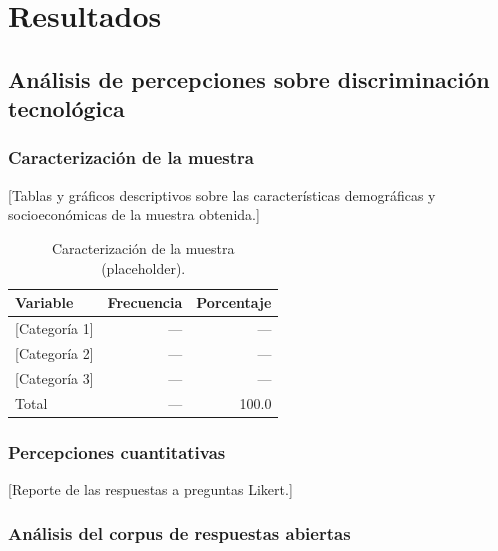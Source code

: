\chapter{Resultados}
\label{cap:resultados}

\section{Análisis de percepciones sobre discriminación tecnológica}
\label{sec:resultados-encuesta}

\subsection{Caracterización de la muestra}

[Tablas y gráficos descriptivos sobre las características demográficas y
socioeconómicas de la muestra obtenida.]

\begin{table}[H]
  \centering
  \caption[Caracterización de la muestra.]{Caracterización de la muestra
  (placeholder).}
  \label{tab:muestra}
  \begin{tabular}{lrr}
    \toprule
    \textbf{Variable} & \textbf{Frecuencia} & \textbf{Porcentaje} \\
    \midrule
    {[Categoría 1]} & --- & --- \\
    {[Categoría 2]} & --- & --- \\
    {[Categoría 3]} & --- & --- \\
    \midrule
    Total         & --- & 100.0 \\
    \bottomrule
  \end{tabular}
\end{table}

\subsection{Percepciones cuantitativas}

[Reporte de las respuestas a preguntas Likert.]

\subsection{Análisis del corpus de respuestas abiertas}

